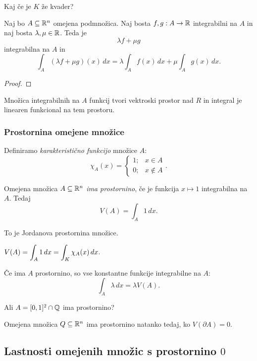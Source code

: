 \begin{opomba}
    Kaj če je \(K\) že kvader? \todo{}
\end{opomba}

\begin{zgled}
    \todo{}
\end{zgled}

\begin{trditev}
    Naj bo \(A \subseteq \mathbb{R}^n\) omejena podmnožica. Naj bosta \(f, g : A \to \mathbb{R}\) integrabilni na \(A\) in naj bosta \(\lambda, \mu \in \mathbb{R}\). Teda je \[\lambda f + \mu g\] integrabilna na \(A\) in \[\int_A (\lambda f + \mu g)(x) \, dx = \lambda \int_A f(x) \, dx + \mu  \int_A g(x) \, dx.\]
\end{trditev}
\begin{proof}
    \todo{}
\end{proof}
\begin{opomba}
    Množica integrabilnih na \(A\) funkcij tvori vektroski prostor nad \(R\) in integral je linearen funkcional na tem prostoru.
\end{opomba}

\subsubsection{Prostornina omejene množice}
Definiramo \emph{karakteristično funkcijo} množice \(A\): \[\chi_A(x) = \begin{cases}
    1; &x \in A \\ 0; &x \notin A
\end{cases}.\]

\begin{definicija}
    Omejena množica \(A \subseteq \mathbb{R}^n\) \emph{ima prostornino}, če je funkcija \(x \mapsto 1\) integrabilna na~\(A\). Tedaj \[V(A) = \int_A 1 \, dx.\] 
\end{definicija}

\begin{opomba}
    To je Jordanova prostornina množice.
\end{opomba}

\begin{opomba}
    \(\displaystyle V(A) = \int_A 1 \, dx = \int_K \chi_A(x) \, dx\).
\end{opomba}

\begin{opomba}
    Če ima \(A\) prostornino, so vse konstantne funkcije integrabilne na \(A\): \[\int_A \lambda \, dx = \lambda V(A).\]
\end{opomba}

\begin{zgled}
    Ali \(A = [0,1]^2 \cap \mathbb{Q}\) ima prostornino?
\end{zgled}

\begin{trditev}
    Omejena množica \(Q \subseteq \mathbb{R}^n\) ima prostornino natanko tedaj, ko \(V(\partial A) = 0\).
\end{trditev}

\subsection{Lastnosti omejenih množic s prostornino \(0\)}

